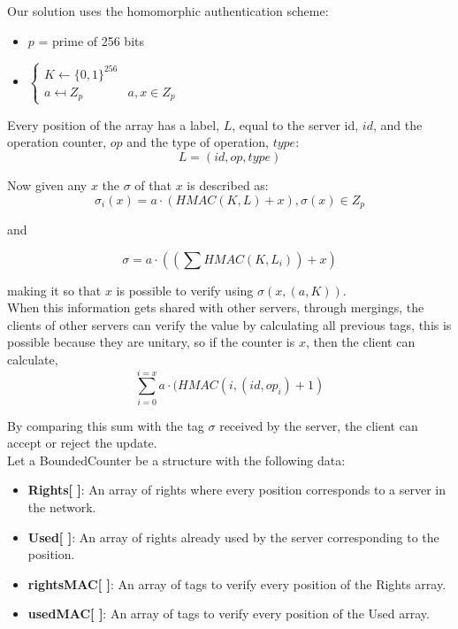 \documentclass{article}
\begin{document}
Our solution uses the homomorphic authentication scheme:\\

\begin{itemize}
    \item $p$ = prime of 256 bits
    \item 
    $
        \begin{cases}
            K \gets \{0,1\}^{256} \\
            a \mapsfrom Z_p & a,x \in Z_p
        \end{cases}
    $
\end{itemize}

Every position of the array has a label, $L$, equal to the server id, $id$, and the operation counter, $op$ and the type of operation, $type$:
\begin{equation}
    L = ( id , op , type)
\end{equation}


Now given any $x$ the $\sigma$ of that $x$ is described as:\\
        
\begin{equation}
    \sigma_i(x) = a \cdot (HMAC(K,L) + x) , \sigma(x) \in Z_p
\end{equation}

and

\begin{equation}
    \sigma = a \cdot ((\sum{HMAC(K,L_i)}) + x)
\end{equation}

making it so that $x$ is possible to verify using $\sigma(x,(a,K))$.
\\

When this information gets shared with other servers, through mergings, the clients of other servers can verify the value by calculating all previous tags, this is possible because they are unitary, so if the counter is $x$, then the client can calculate,
\begin{equation}
    \sum_{i=0}^{i=x}{a \cdot (HMAC(i,(id,op_i) + 1)}
\end{equation}

By comparing this sum with the tag $\sigma$ received by the server, the client can accept or reject the update.\\

Let a BoundedCounter be a structure with the following data:
\begin{itemize}
    \item \textbf{Rights[ ]}: An array of rights where every position corresponds to a server in the network.
    \item \textbf{Used[ ]}: An array of rights already used by the server corresponding to the position.
    \item \textbf{rightsMAC[ ]}: An array of tags to verify every position of the Rights array.
    \item \textbf{usedMAC[ ]}: An array of tags to verify every position of the Used array.
\end{itemize}
\end{document}
